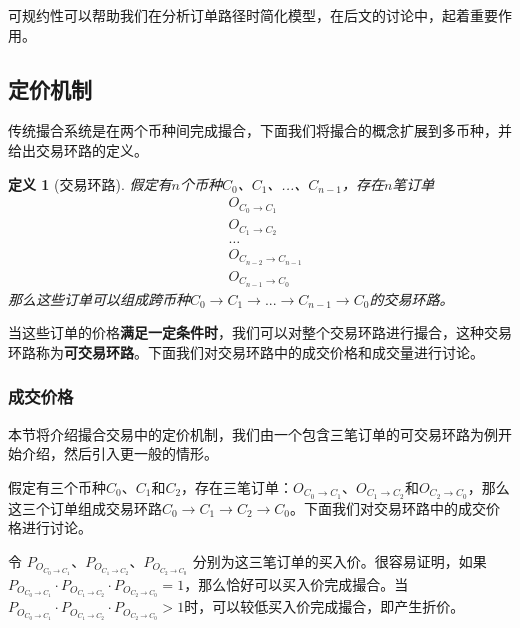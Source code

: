 \documentclass[UTF8,nofonts]{ctexart}
\newtheorem{definition}{定义}[section]
\begin{document}
可规约性可以帮助我们在分析订单路径时简化模型，在后文的讨论中，起着重要作用。

\subsection{定价机制}

传统撮合系统是在两个币种间完成撮合，下面我们将撮合的概念扩展到多币种，并给出交易环路的定义。
\begin{definition}[交易环路]
假定有$n$个币种$C_{0}$、$C_{1}$、...、$C_{n-1}$，存在$n$笔订单
\[ \begin{split}
&O_{C_{0}\rightarrow C_{1}}\\
&O_{C_{1} \rightarrow C_{2}}\\
&\ldots\\
&O_{C_{n-2} \rightarrow C_{n-1}}\\
&O_{C_{n-1} \rightarrow C_{0}}\text{}
\end{split} \]
那么这些订单可以组成跨币种$C_{0}\rightarrow C_{1} \rightarrow ... \rightarrow C_{n-1} \rightarrow C_{0}$的交易环路。
\end{definition}

当这些订单的价格\textbf{满足一定条件时}，我们可以对整个交易环路进行撮合，这种交易环路称为\textbf{可交易环路}。下面我们对交易环路中的成交价格和成交量进行讨论。


\subsubsection{成交价格}

本节将介绍撮合交易中的定价机制，我们由一个包含三笔订单的可交易环路为例开始介绍，然后引入更一般的情形。

假定有三个币种$C_{0}$、$C_{1}$和$C_{2}$，存在三笔订单：$O_{C_{0}\rightarrow C_{1}}$、$O_{C_{1} \rightarrow C_{2}}$和$O_{C_{2} \rightarrow C_{0}}$，那么这三个订单组成交易环路$C_{0}\rightarrow C_{1} \rightarrow C_{2} \rightarrow C_{0}$。下面我们对交易环路中的成交价格进行讨论。

令 $P_{O_{C_{0} \rightarrow C_{1}}}$、$P_{O_{C_{1} \rightarrow C_{2}}}$、$P_{O_{C_{2} \rightarrow C_{0}}}$ 分别为这三笔订单的买入价。很容易证明，如果$P_{O_{C_{0} \rightarrow C_{1}}}\cdot P_{O_{C_{1} \rightarrow C_{2}}}\cdot P_{O_{C_{2} \rightarrow C_{0}}}=1$，那么恰好可以买入价完成撮合。当$P_{O_{C_{0} \rightarrow C_{1}}}\cdot P_{O_{C_{1} \rightarrow C_{2}}}\cdot P_{O_{C_{2} \rightarrow C_{0}}}>1$时，可以较低买入价完成撮合，即产生折价。
\end{document}
